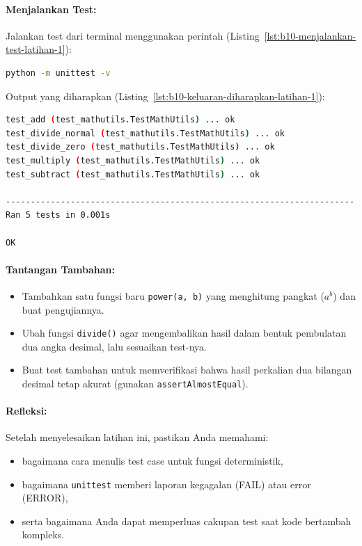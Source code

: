 \paragraph{Menjalankan Test:}
Jalankan test dari terminal menggunakan perintah (Listing~\ref{lst:b10-menjalankan-test-latihan-1}):

\begin{lstlisting}[language=bash, caption={Menjalankan test pada Latihan 1}, label={lst:b10-menjalankan-test-latihan-1}]
python -m unittest -v
\end{lstlisting}

Output yang diharapkan (Listing~\ref{lst:b10-keluaran-diharapkan-latihan-1}):

\begin{lstlisting}[language=bash, caption={Keluaran yang diharapkan pada Latihan 1}, label={lst:b10-keluaran-diharapkan-latihan-1}]
test_add (test_mathutils.TestMathUtils) ... ok
test_divide_normal (test_mathutils.TestMathUtils) ... ok
test_divide_zero (test_mathutils.TestMathUtils) ... ok
test_multiply (test_mathutils.TestMathUtils) ... ok
test_subtract (test_mathutils.TestMathUtils) ... ok

----------------------------------------------------------------------
Ran 5 tests in 0.001s

OK
\end{lstlisting}

\paragraph{Tantangan Tambahan:}
\begin{itemize}
    \item Tambahkan satu fungsi baru \texttt{power(a, b)} yang menghitung pangkat (\( a^b \)) dan buat pengujiannya.
    \item Ubah fungsi \texttt{divide()} agar mengembalikan hasil dalam bentuk pembulatan dua angka desimal, lalu sesuaikan test-nya.
    \item Buat test tambahan untuk memverifikasi bahwa hasil perkalian dua bilangan desimal tetap akurat (gunakan \texttt{assertAlmostEqual}).
\end{itemize}

\paragraph{Refleksi:}
Setelah menyelesaikan latihan ini, pastikan Anda memahami:
\begin{itemize}
    \item bagaimana cara menulis test case untuk fungsi deterministik,
    \item bagaimana \texttt{unittest} memberi laporan kegagalan (FAIL) atau error (ERROR),
    \item serta bagaimana Anda dapat memperluas cakupan test saat kode bertambah kompleks.
\end{itemize}

